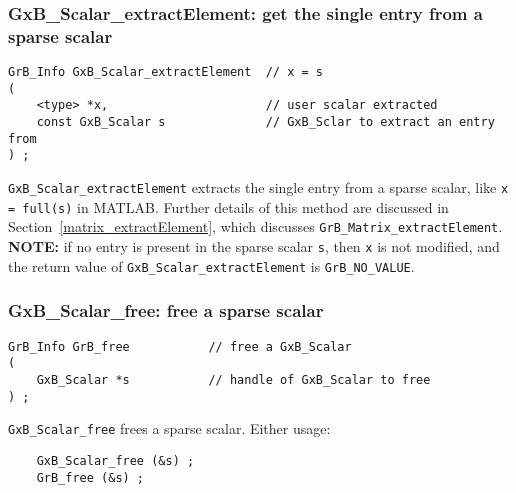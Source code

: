 \documentclass[12pt]{article}
\begin{document}
\newpage
\subsubsection{{\sf GxB\_Scalar\_extractElement:} get the single entry from a sparse scalar}
\label{scalar_extractElement}

\begin{mdframed}[userdefinedwidth=6in]
{\footnotesize
\begin{verbatim}
GrB_Info GxB_Scalar_extractElement  // x = s
(
    <type> *x,                      // user scalar extracted
    const GxB_Scalar s              // GxB_Sclar to extract an entry from
) ;
\end{verbatim} } \end{mdframed}

\verb'GxB_Scalar_extractElement' extracts the single entry from a sparse
scalar, like \verb'x = full(s)' in MATLAB.  Further details of this method are
discussed in Section~\ref{matrix_extractElement}, which discusses
\verb'GrB_Matrix_extractElement'.  {\bf NOTE: }  if no entry is present in the
sparse scalar \verb's', then \verb'x' is not modified, and the return value of
\verb'GxB_Scalar_extractElement' is \verb'GrB_NO_VALUE'.

\subsubsection{{\sf GxB\_Scalar\_free:} free a sparse scalar}
\label{scalar_free}

\begin{mdframed}[userdefinedwidth=6in]
{\footnotesize
\begin{verbatim}
GrB_Info GrB_free           // free a GxB_Scalar
(
    GxB_Scalar *s           // handle of GxB_Scalar to free
) ;
\end{verbatim}
} \end{mdframed}

\verb'GxB_Scalar_free' frees a sparse scalar.  Either usage:

    {\small
    \begin{verbatim}
    GxB_Scalar_free (&s) ;
    GrB_free (&s) ; \end{verbatim}}
\end{document}
